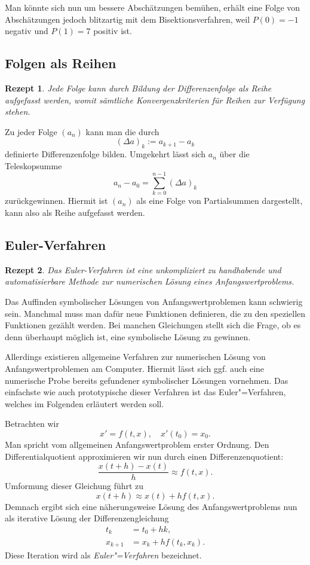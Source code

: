 \documentclass[a4paper,10pt,fleqn,twocolumn,twoside,dvipdfmx]{scrartcl}
\theoremstyle{rmbox}
\newtheorem{Rezept}{Rezept}[section]
\begin{document}
Man könnte sich nun um bessere Abschätzungen bemühen, erhält eine
Folge von Abschätzungen jedoch blitzartig mit dem Bisektionsverfahren,
weil $P(0)=-1$ negativ und $P(1)=7$ positiv ist.

\subsection{Folgen als Reihen}

\begin{Rezept}
Jede Folge kann durch Bildung der Differenzenfolge als Reihe
aufgefasst werden, womit sämtliche Konvergenzkriterien für Reihen
zur Verfügung stehen.
\end{Rezept}

\noindent
Zu jeder Folge $(a_n)$ kann man die durch
\[(\Delta a)_k := a_{k+1} - a_k\]
definierte Differenzenfolge bilden. Umgekehrt lässt sich $a_n$ über
die Teleskopsumme
\[a_n-a_0 = \sum_{k=0}^{n-1} (\Delta a)_k\]
zurückgewinnen. Hiermit ist $(a_n)$ als eine Folge von
Partialsummen dargestellt, kann also als Reihe aufgefasst werden.

\newpage
\subsection{Euler-Verfahren}

\begin{Rezept}
Das Euler-Verfahren ist eine unkompliziert zu handhabende und
automatisierbare Methode zur numerischen Lösung eines
Anfangswertproblems.
\end{Rezept}

\noindent
Das Auffinden symbolischer Lösungen von Anfangswertproblemen kann
schwierig sein. Manchmal muss man dafür neue Funktionen definieren,
die zu den speziellen Funktionen gezählt werden. Bei manchen
Gleichungen stellt sich die Frage, ob es denn überhaupt möglich ist,
eine symbolische Lösung zu gewinnen.

Allerdings existieren allgemeine Verfahren zur numerischen Lösung von
Anfangswertproblemen am Computer. Hiermit lässt sich ggf. auch eine
numerische Probe bereits gefundener symbolischer Lösungen vornehmen.
Das einfachste wie auch prototypische dieser Verfahren ist das
Euler"=Verfahren, welches im Folgenden erläutert werden soll.

Betrachten wir
\[x' = f(t,x),\quad x'(t_0) = x_0.\]
Man spricht vom allgemeinen Anfangswertproblem erster Ordnung. Den
Differentialquotient approximieren wir nun durch einen
Differenzenquotient:%
\[\frac{x(t+h)-x(t)}{h} \approx f(t,x).\]
Umformung dieser Gleichung führt zu
\[x(t+h)\approx x(t)+hf(t,x).\]
Demnach ergibt sich eine näherungsweise Lösung des Anfangswertproblems
nun als iterative Lösung der Differenzengleichung%
\begin{align*}
t_{k} &= t_0+hk,\\
x_{k+1} &= x_k+hf(t_k,x_k).
\end{align*}
Diese Iteration wird als \emph{Euler"=Verfahren} bezeichnet.
\end{document}
